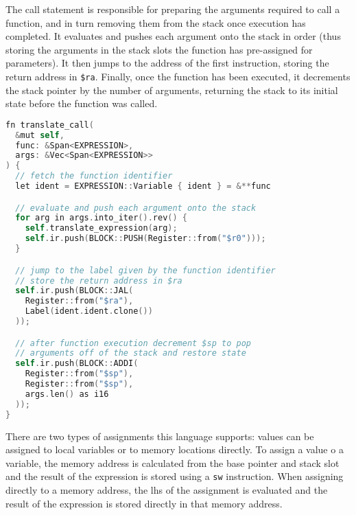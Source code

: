 The call statement is responsible for preparing the arguments required to call a function, and in turn removing them from the stack once execution has completed. It evaluates and pushes each argument onto the stack in order (thus storing the arguments in the stack slots the function has pre-assigned for parameters). It then jumps to the address of the first instruction, storing the return address in \texttt{\$ra}. Finally, once the function has been executed, it decrements the stack pointer by the number of arguments, returning the stack to its initial state before the function was called. 

\begin{lstlisting}[language=C]
fn translate_call(
  &mut self, 
  func: &Span<EXPRESSION>, 
  args: &Vec<Span<EXPRESSION>>
) {
  // fetch the function identifier
  let ident = EXPRESSION::Variable { ident } = &**func 

  // evaluate and push each argument onto the stack 
  for arg in args.into_iter().rev() {
    self.translate_expression(arg);
    self.ir.push(BLOCK::PUSH(Register::from("$r0")));
  }

  // jump to the label given by the function identifier
  // store the return address in $ra
  self.ir.push(BLOCK::JAL(
    Register::from("$ra"), 
    Label(ident.ident.clone())
  ));

  // after function execution decrement $sp to pop 
  // arguments off of the stack and restore state
  self.ir.push(BLOCK::ADDI(
    Register::from("$sp"), 
    Register::from("$sp"), 
    args.len() as i16
  ));
}
\end{lstlisting}

There are two types of assignments this language supports: values can be assigned to local variables or to memory locations directly. To assign a value o a variable, the memory address is calculated from the base pointer and stack slot and the result of the expression is stored using a \texttt{sw} instruction. When assigning directly to a memory address, the lhs of the assignment is evaluated and the result of the expression is stored directly in that memory address. 

